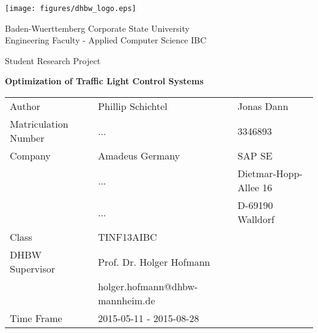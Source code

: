 \thispagestyle{empty}

\texttt{[image: figures/dhbw\_logo.eps]} \\

\begin{center}

\vspace{0.5cm}

{\large Baden-Wuerttemberg Corporate State University}\\
{\large Engineering Faculty - Applied Computer Science IBC}\\

\vspace{0.5cm}

{\large Student Research Project}\\

\vspace{1cm}

{\large \textbf{Optimization of Traffic Light Control Systems}}

\vspace{1.5cm}

\begin{tabular}{lll}
Author				& Phillip Schichtel & Jonas Dann \\
Matriculation Number& ... & 3346893 \\
Company				& Amadeus Germany & SAP SE \\
					& ... & Dietmar-Hopp-Allee 16 \\
					& ... & D-69190 Walldorf \\
Class				& TINF13AIBC & \\
DHBW Supervisor	    & Prof. Dr. Holger Hofmann & \\
					& holger.hofmann@dhbw-mannheim.de & \\
Time Frame			& 2015-05-11 - 2015-08-28\\
\end{tabular}

\vspace{0.5cm}
\vspace{0.5cm}

\end{center}

\newpage